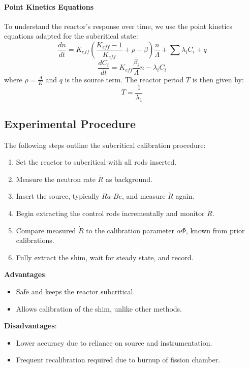 \paragraph{Point Kinetics Equations}
To understand the reactor's response over time, we use the point kinetics equations adapted for the subcritical state:
\begin{equation}
    \frac{dn}{dt} = K_{eff} \left( \frac{K_{eff} - 1}{K_{eff}} + \rho - \beta \right) \frac{n}{\Lambda} + \sum \lambda_i C_i + q
\end{equation}
\begin{equation}
    \frac{dC_i}{dt} = K_{eff} \frac{\beta_i}{\Lambda} n - \lambda_i C_i
\end{equation}
where $\rho = \frac{\Lambda}{K}$ and $q$ is the source term. The reactor period $T$ is then given by:
\begin{equation}
    T = \frac{1}{\lambda_1}
\end{equation}

\subsection{Experimental Procedure}
The following steps outline the subcritical calibration procedure:
\begin{enumerate}
    \item Set the reactor to subcritical with all rods inserted.
    \item Measure the neutron rate $\dot{R}$ as background.
    \item Insert the source, typically $Ra\text{-}Be$, and measure $\dot{R}$ again.
    \item Begin extracting the control rods incrementally and monitor $\dot{R}$.
    \item Compare measured $\dot{R}$ to the calibration parameter $\alpha \Phi$, known from prior calibrations.
    \item Fully extract the shim, wait for steady state, and record.
\end{enumerate}

\begin{tcolorbox}[boxstyle2, title=Pros and Cons]
    \textbf{Advantages}:
    \begin{itemize}
        \item Safe and keeps the reactor subcritical.
        \item Allows calibration of the shim, unlike other methods.
    \end{itemize}
    \textbf{Disadvantages}:
    \begin{itemize}
        \item Lower accuracy due to reliance on source and instrumentation.
        \item Frequent recalibration required due to burnup of fission chamber.
    \end{itemize}
\end{tcolorbox}

